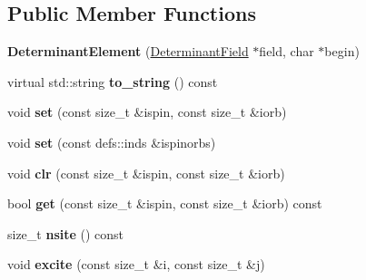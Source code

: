 \subsection*{Public Member Functions}
\begin{DoxyCompactItemize}
\item 
{\bfseries Determinant\+Element} (\hyperlink{classDeterminantField}{Determinant\+Field} $\ast$field, char $\ast$begin)\hypertarget{classDeterminantElement_afa05f6796b4f932f58ef7d153e49c05b}{}\label{classDeterminantElement_afa05f6796b4f932f58ef7d153e49c05b}

\item 
virtual std\+::string {\bfseries to\+\_\+string} () const \hypertarget{classDeterminantElement_af3680358fd1c637e09595d352d1cbc7e}{}\label{classDeterminantElement_af3680358fd1c637e09595d352d1cbc7e}

\item 
void {\bfseries set} (const size\+\_\+t \&ispin, const size\+\_\+t \&iorb)\hypertarget{classDeterminantElement_af950f1affe4063cc566060c9f1fa4f39}{}\label{classDeterminantElement_af950f1affe4063cc566060c9f1fa4f39}

\item 
void {\bfseries set} (const defs\+::inds \&ispinorbs)\hypertarget{classDeterminantElement_a2409ff9d9478c04fbd08e8859ac26555}{}\label{classDeterminantElement_a2409ff9d9478c04fbd08e8859ac26555}

\item 
void {\bfseries clr} (const size\+\_\+t \&ispin, const size\+\_\+t \&iorb)\hypertarget{classDeterminantElement_aaa0f8aa17b2fd38321301b515c80211d}{}\label{classDeterminantElement_aaa0f8aa17b2fd38321301b515c80211d}

\item 
bool {\bfseries get} (const size\+\_\+t \&ispin, const size\+\_\+t \&iorb) const \hypertarget{classDeterminantElement_ad0f34527d28f3d3a5c65f1035e9b08f9}{}\label{classDeterminantElement_ad0f34527d28f3d3a5c65f1035e9b08f9}

\item 
size\+\_\+t {\bfseries nsite} () const \hypertarget{classDeterminantElement_a0173c3c47f5140360769ab8d5b7a1505}{}\label{classDeterminantElement_a0173c3c47f5140360769ab8d5b7a1505}

\item 
void {\bfseries excite} (const size\+\_\+t \&i, const size\+\_\+t \&j)\hypertarget{classDeterminantElement_a6233e3f402771d9abfd784d104a85a77}{}\label{classDeterminantElement_a6233e3f402771d9abfd784d104a85a77}


\end{DoxyCompactItemize}
